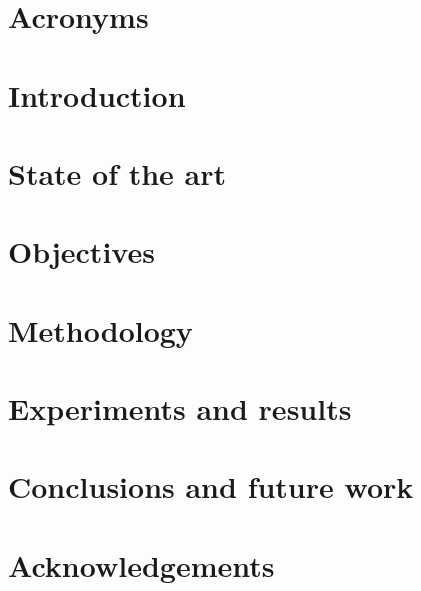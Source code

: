 \documentclass[12pt, a4paper]{article}
\begin{document}

% 

\newpage
{}
 

\tableofcontents\thispagestyle{empty}\newpage
\listoffigures\thispagestyle{empty}\newpage
\listoftables\thispagestyle{empty}\newpage

\section*{Acronyms}


\section{Introduction}
\label{sec:introduction}

\newpage

\section{State of the art}
\label{sec:sota}

\newpage

\section{Objectives}
\label{sec:objectives}

\newpage

\section{Methodology}
\label{sec:methodology}

\newpage

\section{Experiments and results}
\label{sec:experiments_and_results}

\newpage

\section{Conclusions and future work}
\label{sec:conclusions_and_future_work}

\newpage

\newpage
\section*{Acknowledgements}
\label{acknowledgements}

\newpage

\newpage\printbibliography
{}
\newpage

\begin{appendices}
  
\end{appendices}
\end{document}

